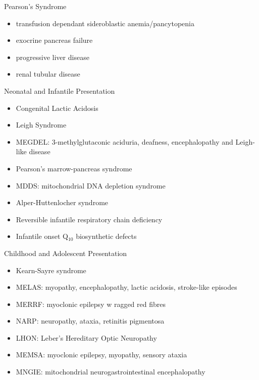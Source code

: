 \documentclass[presentation, smaller]{beamer}
\begin{document}
\begin{frame}[label={sec:org54f5ef0}]{Pearson's Syndrome}
\begin{itemize}
\item transfusion dependant sideroblastic anemia/pancytopenia
\item exocrine pancreas failure
\item progressive liver disease
\item renal tubular disease
\end{itemize}
\end{frame}

\begin{frame}[label={sec:org322aeee}]{Neonatal and Infantile Presentation}
\begin{itemize}
\item Congenital Lactic Acidosis
\item Leigh Syndrome
\item MEGDEL: 3-methylglutaconic aciduria, deafness, encephalopathy and Leigh-like disease
\item Pearson's marrow-pancreas syndrome
\item MDDS: mitochondrial DNA depletion syndrome
\item Alper-Huttenlocher syndrome
\item Reversible infantile respiratory chain deficiency
\item Infantile onset Q\(_{\text{10}}\) biosynthetic defects
\end{itemize}
\end{frame}

\begin{frame}[label={sec:org85d8d3b}]{Childhood and Adolescent Presentation}
\begin{itemize}
\item Kearn-Sayre syndrome
\item MELAS: myopathy, encephalopathy, lactic acidosis, stroke-like episodes
\item MERRF: myoclonic epilepsy w ragged red fibres
\item NARP: neuropathy, ataxia, retinitis pigmentosa
\item LHON: Leber's Hereditary Optic Neuropathy
\item MEMSA: myoclonic epilepsy, myopathy, sensory ataxia
\item MNGIE: mitochondrial neurogastrointestinal encephalopathy
\end{itemize}
\end{frame}
\end{document}
